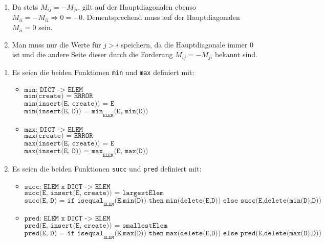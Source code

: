 \documentclass[a4paper,11pt]{article}             %
\begin{document}
\begin{enumerate}
\item Da stets $M_{ij} = - M_{ji}$, gilt auf der Hauptdiagonalen ebenso $M_{ii} = -M_{ii} \Rightarrow 0 = -0$. Dementsprechend muss auf der Hauptdiagonalen $M_{ii} = 0$ sein.

\item Man muss nur die Werte für $j > i$ speichern, da die Hauptdiagonale immer $0$ ist und die andere Seite dieser durch die Forderung $M_{ij} = -M_{ji}$ bekannt sind.
\end{enumerate}

\begin{enumerate}
\item Es seien die beiden Funktionen \texttt{min} und \texttt{max} definiert mit:
\begin{itemize}
\item
$\texttt{min: DICT -> ELEM}$\\
$\texttt{min(create) = ERROR}$\\
$\texttt{min(insert(E, create)) = E}$\\
$\texttt{min(insert(E, D)) = min}_{\texttt{ELEM}}\texttt{(E, min(D))}$

\item
$\texttt{max: DICT -> ELEM}$\\
$\texttt{max(create) = ERROR}$\\
$\texttt{max(insert(E, create)) = E}$\\
$\texttt{max(insert(E, D)) = max}_{\texttt{ELEM}}\texttt{(E, max(D))}$
\end{itemize}

\item Es seien die beiden Funktionen \texttt{succ} und \texttt{pred} definiert mit:
\begin{itemize}
\item
$\texttt{succ: ELEM x DICT -> ELEM}$\\
$\texttt{succ(E, insert(E, create)) = largestElem}$\\
$\texttt{succ(E, D) = if isequal}_{\texttt{ELEM}}\texttt{(E,min(D)) then min(delete(E,D)) else succ(E,delete(min(D),D))}$\\

\item
$\texttt{pred: ELEM x DICT -> ELEM}$\\
$\texttt{pred(E, insert(E, create)) = smallestElem}$\\
$\texttt{pred(E, D) = if isequal}_{\texttt{ELEM}}\texttt{(E,max(D)) then max(delete(E,D)) else pred(E,delete(max(D),D))}$\\

\end{itemize}
\end{enumerate}
\end{document}
